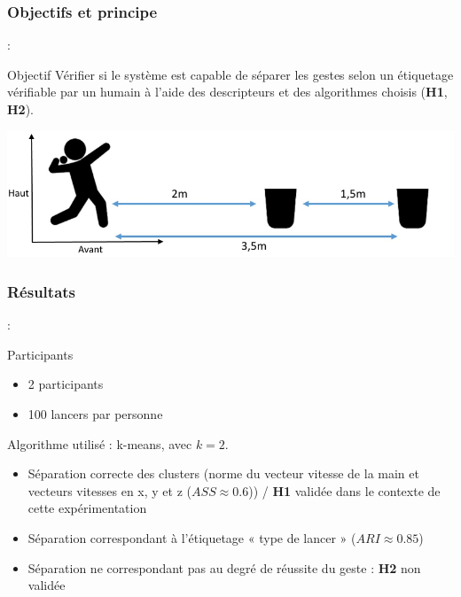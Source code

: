\documentclass[svgnames]{beamer}
\begin{document}
	\subsubsection{Objectifs et principe}
	\begin{frame}{\subsecname : \MakeLowercase{\subsubsecname}}
		\begin{block}{Objectif}
			Vérifier si le système est capable de séparer les gestes selon un étiquetage vérifiable par un humain à l'aide des descripteurs et des algorithmes choisis (\textbf{H1}, \textbf{H2}).
		\end{block}
		
		\vspace{1cm}
		
		\centering
		\includegraphics[scale=0.5]{img/ball_throwing.png}

	\end{frame}
	
	\subsubsection{Résultats}
	\begin{frame}{\subsecname : \MakeLowercase{\subsubsecname}}
		\begin{block}{Participants}
			\begin{itemize}[label=$\bullet$]
				\item 2 participants
				\item 100 lancers par personne
			\end{itemize}
		\end{block}
		
	Algorithme utilisé : k-means, avec $k=2$.
	\begin{itemize}
		\item Séparation correcte des clusters (norme du vecteur vitesse de la main et vecteurs vitesses en x, y et z ($ASS \approx 0.6$)) / \textbf{H1} validée dans le contexte de cette expérimentation
		\item Séparation correspondant à l'étiquetage « type de lancer » ($ARI \approx 0.85$)
		\item Séparation ne correspondant pas au degré de réussite du geste : \textbf{H2} non validée
	\end{itemize}
		
		
	\end{frame}
\end{document}
